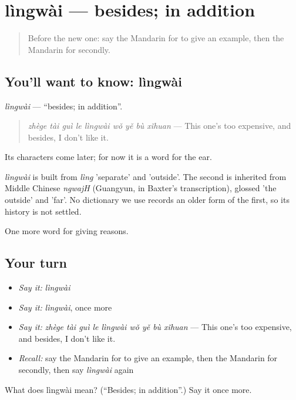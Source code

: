 \section[lìngwài]{lìngwài — besides; in addition}

\label{lesson:ZH-C369-lingwai}



\begin{quote}
Before the new one: say the Mandarin for to give an example, then the Mandarin for secondly.
\end{quote}

\subsection*{You'll want to know: lìngwài}
\emph{lìngwài} — \textquotedblleft{}besides; in addition\textquotedblright{}.

\begin{quote}
\emph{zhège tài guì le lìngwài wǒ yě bù xǐhuan} — This one's too expensive, and besides, I don't like it.
\end{quote}

Its characters come later; for now it is a word for the ear.

\begin{cousinweb}
\emph{lìngwài} is built from \emph{lìng} 'separate' and  'outside'. The second is inherited from Middle Chinese \emph{ngwajH} (Guangyun, in Baxter's transcription), glossed 'the outside' and 'far'. No dictionary we use records an older form of the first, so its history is not settled.
\end{cousinweb}

\begin{grammarlens}[title={What you've built}]
One more word for giving reasons.
\end{grammarlens}

\subsection*{Your turn}
\begin{itemize}
\raggedright
  \item \emph{Say it:} \emph{lìngwài}
  \item \emph{Say it:} \emph{lìngwài}, once more
  \item \emph{Say it:} \emph{zhège tài guì le lìngwài wǒ yě bù xǐhuan} — This one's too expensive, and besides, I don't like it.
  \item \emph{Recall:} say the Mandarin for to give an example, then the Mandarin for secondly, then say \emph{lìngwài} again
\end{itemize}

\begin{tcolorbox}[breakable,colback=teal!4,colframe=teal!35!black,title={Before you move on}]
What does lìngwài mean? (\textquotedblleft{}Besides; in addition\textquotedblright{}.) Say it once more.
\end{tcolorbox}
